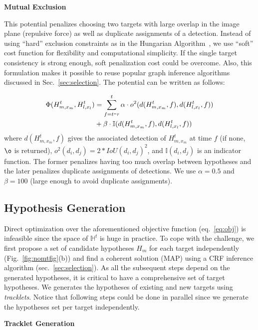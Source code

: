 \documentclass[10pt,twocolumn,letterpaper]{article}
\newcommand{\nosection}[1]{\vspace{2mm}\noindent\textbf{#1}}
\newcommand{\minus}{\scalebox{0.5}[1.0]{$-$}}
\begin{document}
\nosection{Mutual Exclusion}
\vspace{0.25em}

This potential penalizes choosing two targets with large overlap in the image plane (repulsive force) as well as duplicate assignments of a detection. 
Instead of using ``hard'' exclusion constraints as in the Hungarian Algorithm~\cite{Kuhn_NRLQ_55}, we use ``soft'' cost function for flexibility and computational simplicity. If the single target consistency is strong enough, soft penalization cost could be overcome. Also, this formulation makes it possible to reuse popular graph inference algorithms discussed in Sec.~\ref{sec:selection}. The potential can be written as follows:

{\footnotesize
\begin{align}
\Phi(H_{m, x_m}^t , H_{l, x_l}^t ) &= \sum_{f=t \minus \tau}^t  \alpha \cdot o^2(d(H_{m,x_m}^t, f), d(H_{l, x_l}^t, f)) \nonumber \\
& + \beta \cdot \mathbb{I}(d(H_{m,x_m}^t, f), d(H_{l, x_l}^t, f))
\end{align} }
where $d(H_{m,x_m}^t, f)$ gives the associated detection of $H_{m,x_m}^t$ at time $f$ (if none, $\o$ is returned), $o^2(d_i, d_j) = 2 * IoU(d_i, d_j)^2$, and $\mathbb{I}(d_i, d_j)$ is an indicator function. 
The former penalizes having too much overlap between hypotheses and the later penalizes duplicate assignments of detections. We use $\alpha = 0.5$ and $\beta = 100$ (large enough to avoid duplicate assignments).  


\subsection{Hypothesis Generation}
\label{sec:generation}

Direct optimization over the aforementioned objective function (eq.~\ref{eq:obj}) is infeasible since the space of $\mathbb{H}^t$ is huge in practice. To cope with the challenge, we first propose a set of candidate hypotheses $H_m$ for each target independently (Fig.~\ref{fig:nomtfig}(b)) and find a coherent solution (MAP) using a CRF inference algorithm (sec.~\ref{sec:selection}). As all the subsequent steps depend on the generated hypotheses, it is critical to have a comprehensive set of target hypotheses. We generates the hypotheses of existing and new targets using \emph{tracklets}. Notice that following steps could be done in parallel since we generate the hypotheses set per target independently.

\nosection{Tracklet Generation}
\vspace{0.25em}
\end{document}
